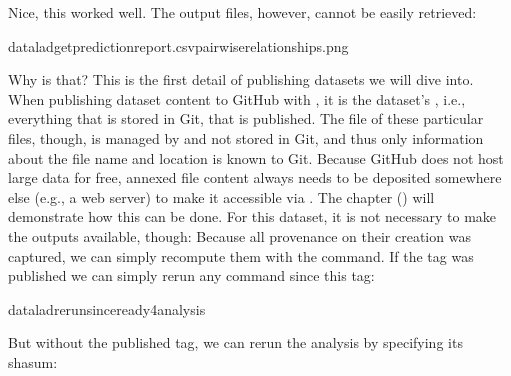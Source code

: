\sphinxAtStartPar
Nice, this worked well. The output files, however, cannot be easily
retrieved:

\begin{sphinxVerbatim}[commandchars=\\\{\}]
dataladgetprediction\PYGZus{}report.csvpairwise\PYGZus{}relationships.png
\end{sphinxVerbatim}

\sphinxAtStartPar
Why is that? This is the first detail of publishing datasets we will dive into.
When publishing dataset content to GitHub with , it is
the dataset’s , i.e., everything that is stored in Git, that is
published. The file  of these particular files, though, is managed
by {\hyperref[\detokenize{glossary:term-git-annex}]{}} and not stored in Git, and
thus only information about the file name and location is known to Git.
Because GitHub does not host large data for free, annexed file content always
needs to be deposited somewhere else (e.g., a web server) to make it
accessible via . The chapter {\hyperref[\detokenize{basics/basics-thirdparty:chapter-thirdparty}]{}} ()
will demonstrate how this can be done. For this dataset, it is not
necessary to make the outputs available, though: Because all provenance
on their creation was captured, we can simply recompute them with the
 command. If the tag was published we can simply
rerun any  command since this tag:

\begin{sphinxVerbatim}[commandchars=\\\{\}]
dataladrerun\PYGZhy{}\PYGZhy{}sinceready4analysis
\end{sphinxVerbatim}

\sphinxAtStartPar
But without the published tag, we can rerun the analysis by specifying its
shasum:

